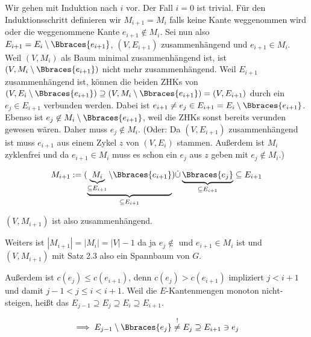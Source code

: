 \begin{solution}
\begin{enumerate}[label = (\Alph*)]
    Wir gehen mit Induktion nach $i$ vor.
    Der Fall $i = 0$ ist trivial.
    Für den Induktionsschritt definieren wir $M_{i+1} = M_i$ falls keine Kante weggenommen wird oder die weggenommene Kante $e_{i+1} \not \in M_i$.
    Sei nun also $E_{i+1} = E_i \setminus \Bbraces{e_{i+1}}$, $(V, E_{i+1})$ zusammenhängend und $e_{i+1} \in M_i$.
    Weil $(V, M_i)$ als Baum minimal zusammenhängend ist, ist $(V, M_i \setminus \Bbraces{e_{i+1}})$ nicht mehr zusammenhängend.
    Weil $E_{i+1}$ zusammenhängend ist, können die beiden ZHKs von $(V, E_i \setminus \Bbraces{e_{i+1}}) \supseteq (V, M_i \setminus \Bbraces{e_{i+1}}) = (V, E_{i+1})$ durch ein $e_j \in E_{i+1}$ verbunden werden. 
    Dabei ist $e_{i+1} \neq e_j \in E_{i+1} = E_i \setminus \Bbraces{e_{i+1}}$.
    Ebenso ist $e_j \not \in M_i \setminus \Bbraces{e_{i+1}}$, weil die ZHKs sonst bereits verunden gewesen wären.
    Daher muss $e_j \not \in M_i$. (Oder: Da $(V,E_{i + 1})$ zusammenhängend ist muss $e_{i + 1}$ aus einem Zykel $z$ von $(V,E_i)$ stammen. Außerdem ist $M_i$ zyklenfrei und da $e_{i + 1} \in M_i$ muss es schon ein $e_j$ aus $z$ geben mit $e_j \notin M_i$.)

    \begin{align*}
        M_{i+1}
        :=
        (
            \underbrace
            {
                \underbrace{M_i}_{\subseteq E_{i+1}}
                \setminus
                \Bbraces{e_{i+1}}
            }_{
                \subseteq E_{i+1}
            }
        )
        \dot \cup
        \underbrace
        {
            \Bbraces{e_j}
        }_{
            \subseteq E_{i+1}
        }
        \subseteq
        E_{i+1}
    \end{align*}

    $(V, M_{i+1})$ ist also zusammenhängend.

    Weiters ist $|M_{i+1}| = |M_i| = |V| - 1$ da ja $e_j \not \in$ und $e_{i+1} \in M_i$ ist und $(V, M_{i+1})$ mit Satz 2.3 also ein Spannbaum von $G$.

    Außerdem ist $c(e_j) \leq c(e_{i+1})$, denn $c(e_j) > c(e_{i+1})$ impliziert $j < i + 1$ und damit $j-1 < j \leq i < i+1$.
    Weil die $E$-Kantenmengen monoton nicht-steigen, heißt das $E_{j-1} \supseteq E_j \supseteq E_i \supseteq E_{i+1}$.

    \begin{align*}
        \implies
        E_{j-1} \setminus \Bbraces{e_j}
        \stackrel{!}{\neq}
        E_j
        \supseteq
        E_{i+1}
        \ni
        e_j
    \end{align*}


\end{enumerate}
\end{solution}
